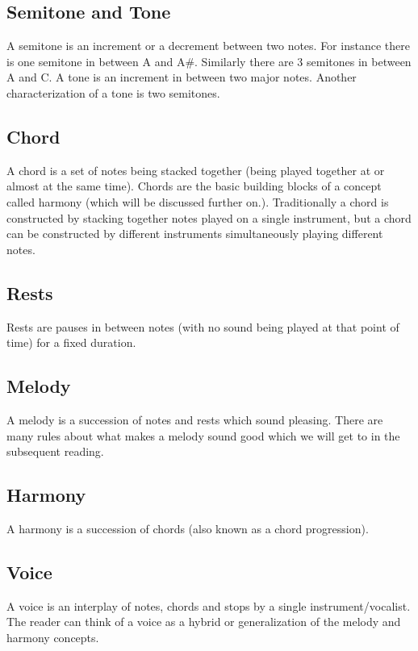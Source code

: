 \subsection{Semitone and Tone}
\noindent A semitone is an increment or a decrement between two notes. For instance there is one semitone in between A and A\#. Similarly there are 3 semitones in between A and C. A tone is an increment in between two major notes. Another characterization of a tone is two semitones.

\subsection*{Chord}
\noindent A chord is a set of notes being stacked together (being played together at or almost at the same time). Chords are the basic building blocks of a concept called harmony (which will be discussed further on.). Traditionally a chord is constructed by stacking together notes played on a single instrument, but a chord can be constructed by different instruments simultaneously playing different notes. 

\subsection{Rests}
\noindent Rests are pauses in between notes (with no sound being played at that point of time) for a fixed duration.

\subsection{Melody}
\noindent A melody is a succession of notes and rests which sound pleasing. There are many rules about what makes a melody sound good which we will get to in the subsequent reading.

\subsection{Harmony}
\noindent A harmony is a succession of chords (also known as a chord progression). 

\subsection{Voice}
\noindent A voice is an interplay of notes, chords and stops by a single instrument/vocalist. The reader can think of a voice as a hybrid or generalization of the melody and harmony concepts. 

